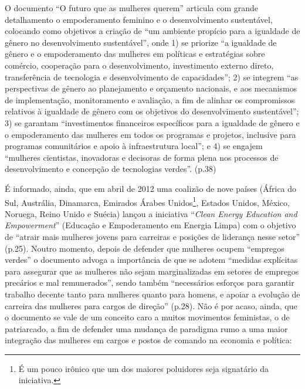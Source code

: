 O documento ``O futuro que as mulheres querem'' articula com grande
detalhamento o empoderamento feminino e o desenvolvimento sustentável,
colocando como objetivos a criação de ``um ambiente propício para a
igualdade de gênero no desenvolvimento sustentável'', onde 1) se
priorize ``a igualdade de gênero e o empoderamento das mulheres em
políticas e estratégias sobre comércio, cooperação para o
desenvolvimento, investimento externo direto, transferência de
tecnologia e desenvolvimento de capacidades''; 2) se integrem ``as
perspectivas de gênero ao planejamento e orçamento nacionais, e aos
mecanismos de implementação, monitoramento e avaliação, a fim de alinhar
os compromissos relativos à igualdade de gênero com os objetivos do
desenvolvimento sustentável''; 3) se garantam ``investimentos
financeiros específicos para a igualdade de gênero e o empoderamento das
mulheres em todos os programas e projetos, inclusive para programas
comunitários e apoio à infraestrutura local''; e 4) se engajem
``mulheres cientistas, inovadoras e decisoras de forma plena nos
processos de desenvolvimento e concepção de tecnologias verdes''. (p.38)

É informado, ainda, que em abril de 2012 uma coalizão de nove países
(África do Sul, Austrália, Dinamarca, Emirados Árabes Unidos\footnote{É
  um pouco irônico que um dos maiores poluidores seja signatário da
  iniciativa.}, Estados Unidos, México, Noruega, Reino Unido e Suécia)
lançou a iniciativa ``\emph{Clean Energy Education and Empowerment}''
(Educação e Empoderamento em Energia Limpa) com o objetivo de ``atrair
mais mulheres jovens para carreiras e posições de liderança nesse
setor'' (p.25). Noutro momento, depois de defender que mulheres ocupem
``empregos verdes'' o documento advoga a importância de que se adotem
``medidas explícitas para assegurar que as mulheres não sejam
marginalizadas em setores de empregos precários e mal remunerados'',
sendo também ``necessários esforços para garantir trabalho decente tanto
para mulheres quanto para homens, e apoiar a evolução de carreira das
mulheres para cargos de direção'' (p.28). Não é por acaso, ainda, que o
documento se vale de um conceito caro a muitos movimentos feministas, o
de patriarcado, a fim de defender uma mudança de paradigma rumo a uma
maior integração das mulheres em cargos e postos de comando na economia
e política:

